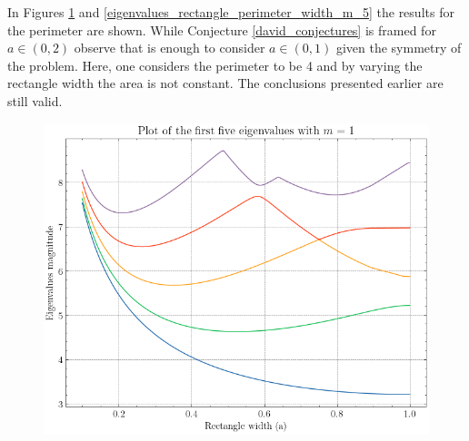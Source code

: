 In Figures \ref{eigenvalues_rectangle_perimeter_width_m_1} and \ref{eigenvalues_rectangle_perimeter_width_m_5} the results for the perimeter are shown. While Conjecture \ref{david_conjectures} is framed for \(a \in (0, 2)\) observe that is enough to consider \(a \in (0, 1)\) given the symmetry of the problem. Here, one considers the perimeter to be 4 and by varying the rectangle width the area is not constant. The conclusions presented earlier are still valid.

\begin{figure}[!htb]
    \centering
    \begin{minipage}{.5\textwidth}
      \centering
      \includegraphics[width=\linewidth]{Images/Dirac/quad/eigenvalues_rectangle_perimeter_width_m_1.png}
      \captionsetup{width=0.9\linewidth} %
      \label{eigenvalues_rectangle_perimeter_width_m_1}
    \end{minipage}%
    \begin{minipage}{.5\textwidth}
      \centering

\end{minipage}
\end{figure}
